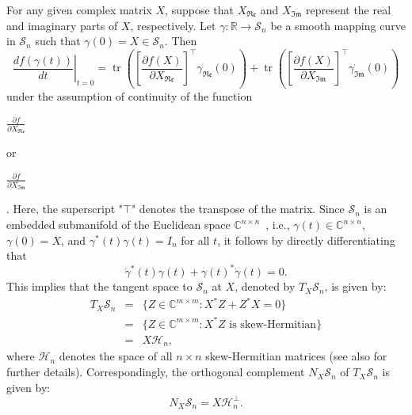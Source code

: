 \documentclass[sn-mathphys-num]{sn-jnl}%
\theoremstyle{thmstyleone}%
\theoremstyle{thmstyletwo}%
\theoremstyle{thmstylethree}%
\begin{document}
For any given complex matrix $X$, suppose that $X_{\mathfrak{Re}}$ and $X_{\mathfrak{Im}}$ represent the real and imaginary parts of $X$, respectively.
Let $\gamma:\mathbb{R} \rightarrow \mathcal{S}_n$ be a smooth mapping curve in $\mathcal{S}_n$ such that $\gamma(0) = X\in\mathcal{S}_n$.  Then 
\begin{equation}\label{eq:DFT}
\left.\dfrac{d f(\gamma(t))}{dt}\right\vert_{t=0}  =
 \operatorname{tr}\left(
 \left[
 \frac{\partial f(X)}{\partial X_{\!\mathfrak{Re}}}\right]^\top \dot{\gamma_{\mathfrak{Re}}}(0)
 \right
 )
 +
\operatorname{tr}\left( \left[
  \frac{\partial f(X)}{\partial X_{\!\mathfrak{Im}}}
 \right]^\top \dot{\gamma_{\mathfrak{Im}}}(0)
 \right)
\end{equation}
under the assumption of continuity of the function
\begin{large}$\frac{\partial f}{\partial X_{\!\mathfrak{Re}}}$\end{large} or \begin{large}$\frac{\partial f}{\partial X_{\!\mathfrak{Im}}}$\end{large}.
Here, the superscript "$\top$" denotes the transpose of the matrix. Since $\mathcal{S}_n$ is an embedded submanifold of the Euclidean space $\mathbb{C}^{n\times n}$~\cite{Shu2024}, i.e., $\gamma(t) \in \mathbb{C}^{n\times n}$, $\gamma(0)= X$, and $\gamma^*(t) \gamma(t) = I_n$ for all $t$, it follows by directly differentiating that 
\begin{equation}
\dot{\gamma}^*(t) \gamma(t) +\gamma(t)^* \dot{\gamma}(t) = 0.
\end{equation}
This implies that the tangent space to $\mathcal{S}_{n}$ at $X$, 
 denoted by $T_{X}\mathcal{S}_n$, is given by:
 \begin{eqnarray}\label{eq:tangent}
        T_X \mathcal{S}_n &=& \{Z \in\mathbb{C}^{m\times m}:
    X^* Z+ Z^* X  =0
    \} \nonumber \\
       &=& \{Z \in\mathbb{C}^{m\times m}:
    X^* Z \mbox{ is skew-Hermitian}
    \} \\
     &=&  X \mathcal{H}_n, \nonumber
\end{eqnarray}
 where $\mathcal{H}_n$ denotes the space of all $n \times n$ skew-Hermitian matrices (see also \cite{Edelman1998} for further details). Correspondingly, the orthogonal complement $N_{X} \mathcal{S}_n$ of  $T_{X}\mathcal{S}_n$ is given by: 
 \begin{equation}\label{eq:orthogonal}
        N_{X} \mathcal{S}_n =  X \mathcal{H}_n^\perp.
\end{equation}
%
\end{document}

